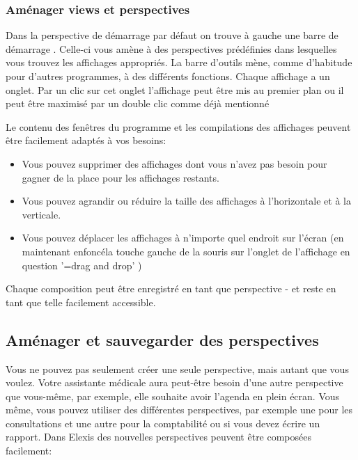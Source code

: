 \subsubsection{Aménager views et perspectives}


Dans la perspective de démarrage par défaut on trouve à gauche une \glqq barre de démarrage \grqq{}. Celle-ci vous amène à des perspectives prédéfinies dans lesquelles vous trouvez les affichages appropriés.
La barre d'outils mène, comme d'habitude pour d'autres programmes, à des différents fonctions. Chaque affichage a un onglet. Par un clic sur cet onglet l'affichage peut être mis au premier plan ou il peut être maximisé par un double clic comme déjà mentionné

\par
{}
\medskip
Le contenu des fenêtres du programme et les compilations des affichages peuvent être facilement adaptés à vos besoins:\\

\begin{itemize}
  \item Vous pouvez supprimer des affichages dont vous n'avez pas besoin pour gagner de la place pour les affichages restants.
	\item Vous pouvez agrandir ou réduire la taille des affichages à l'horizontale et à la verticale.
	\item Vous pouvez déplacer les affichages à n'importe quel endroit sur l'écran (en \glqq maintenant enfoncé\grqq{}la touche gauche de la souris sur l'onglet de l'affichage en question '=drag and drop'  )
\end{itemize}

Chaque composition peut être enregistré en tant que perspective - et reste en tant que telle
facilement accessible.


\subsection{Aménager et sauvegarder des perspectives}
\label{tour:customize}
Vous ne pouvez pas seulement créer une seule perspective, mais autant que vous voulez. Votre assistante médicale aura peut-être besoin d'une autre perspective que vous-même, par exemple, elle souhaite avoir l'agenda en plein écran. Vous même, vous pouvez utiliser des différentes perspectives, par exemple une pour les consultations et une autre pour la comptabilité ou si vous devez écrire un rapport.
Dans Elexis des nouvelles perspectives peuvent être composées facilement:\\

